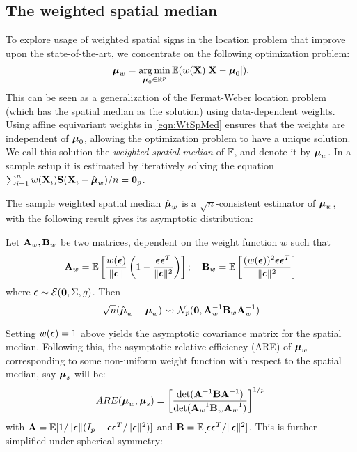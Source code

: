 \subsection{The weighted spatial median} 
To explore usage of weighted spatial signs in the location problem that improve upon the state-of-the-art, we concentrate on the following optimization problem:
%
\begin{equation}\label{eqn:WtSpMed}
{\boldsymbol{\mu}}_w = \operatorname*{arg\,min}_{{\boldsymbol{\mu}}_0 \in \mathbb{R}^p} {\mathbb{E}} ( w({\mathbf{X}}) | {\mathbf{X}} - {\boldsymbol{\mu}}_0 |).
\end{equation}
%
This can be seen as a generalization of the Fermat-Weber location problem (which has the spatial median \citep{brown83, Chaudhuri96} as the solution) using data-dependent weights. Using affine equivariant weights in \eqref{eqn:WtSpMed} ensures that the weights are independent of ${\boldsymbol{\mu}}_0$, allowing the optimization problem to have a unique solution. We call this solution the \textit{weighted spatial median} of ${\mathbb{F}}$, and denote it by ${\boldsymbol{\mu}}_w$. In a sample setup it is estimated by iteratively solving the equation $\sum_{i=1}^n w({\mathbf{X}}_i) {\mathbf{S}} ({\mathbf{X}}_i - \hat{{\boldsymbol{\mu}}}_w)/n = {\bf 0}_p$.

The sample weighted spatial median $\hat{{\boldsymbol{\mu}}}_w$ is a $\sqrt n$-consistent estimator of ${\boldsymbol{\mu}}_w$, with the following result gives its asymptotic distribution:
%
\begin{Theorem}
Let ${\mathbf{A}}_w, {\mathbf{B}}_w$ be two matrices, dependent on the weight function $w$ such that
%
$$
{\mathbf{A}}_w = {\mathbb{E}} \left[ \frac{w( {\boldsymbol{\epsilon}} ) }{\| {\boldsymbol{\epsilon}} \|} \left( 1 - \frac{{\boldsymbol{\epsilon}} {\boldsymbol{\epsilon}}^T}{\| {\boldsymbol{\epsilon}} \|^2} \right) \right];
\quad
{\mathbf{B}}_w = {\mathbb{E}} \left[ \frac{(w( {\boldsymbol{\epsilon}} ))^2 {\boldsymbol{\epsilon}} {\boldsymbol{\epsilon}}^T}{\| {\boldsymbol{\epsilon}} \|^2} \right]
$$
%
where ${\boldsymbol{\epsilon}} \sim \mathcal E({\bf 0}, \Sigma, g)$. Then
%
\begin{equation}
\sqrt n (\hat{{\boldsymbol{\mu}}}_w - {\boldsymbol{\mu}}_w) \leadsto \mathcal{N}_p ({\bf 0}, {\mathbf{A}}_w^{-1} {\mathbf{B}}_w {\mathbf{A}}_w^{-1})
\end{equation}
\end{Theorem}
%

Setting $w({\boldsymbol{\epsilon}})=1$ above yields the asymptotic covariance matrix for the spatial median. Following this, the asymptotic relative efficiency (ARE) of ${\boldsymbol{\mu}}_w$ corresponding to some non-uniform weight function with respect to the spatial median, say ${\boldsymbol{\mu}}_s$ will be:
%
$$
ARE( {\boldsymbol{\mu}}_w, {\boldsymbol{\mu}}_s) = \left[ \frac{\text{det} ({\mathbf{A}}^{-1} {\mathbf{B}} {\mathbf{A}}^{-1})}{\text{det} ( {\mathbf{A}}_w^{-1} {\mathbf{B}}_w {\mathbf{A}}_w^{-1})} \right]^{1/p}
$$
%
with ${\mathbf{A}} = {\mathbb{E}} [ 1/ \| {\boldsymbol{\epsilon}} \| ( I_p - {\boldsymbol{\epsilon}} {\boldsymbol{\epsilon}}^T/ \| {\boldsymbol{\epsilon}} \|^2 ) ]$ and ${\mathbf{B}} = {\mathbb{E}} [ {\boldsymbol{\epsilon}} {\boldsymbol{\epsilon}}^T/ \| {\boldsymbol{\epsilon}} \|^2 ]$. This is further simplified under spherical symmetry:

